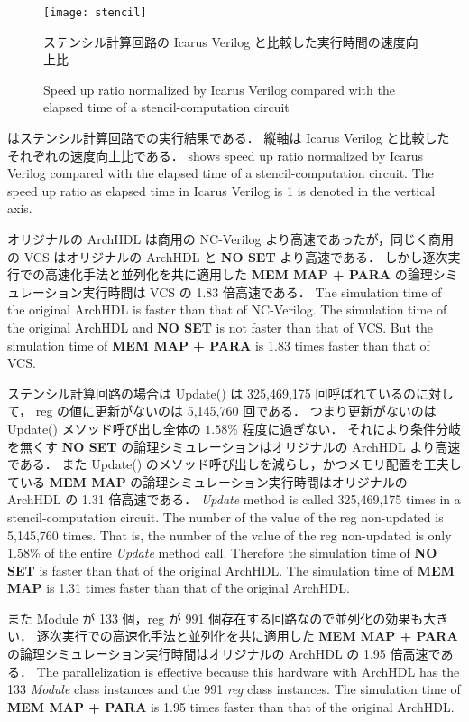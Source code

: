 \fi

\begin{figure}[tb]
 \centering
 \texttt{[image: stencil]}
 \caption{ステンシル計算回路の Icarus Verilog と比較した実行時間の速度向上比}
\fi
 \caption{Speed up ratio normalized by Icarus Verilog compared with the elapsed time of a stencil-computation circuit}
 \label{fig:stencil}
\end{figure}

 はステンシル計算回路での実行結果である．
縦軸は Icarus Verilog と比較したそれぞれの速度向上比である．
\fi
{} shows speed up ratio normalized by Icarus Verilog compared with the elapsed time of a stencil-computation circuit.
The speed up ratio as elapsed time in Icarus Verilog is 1 is denoted in the vertical axis.

オリジナルの ArchHDL は商用の NC-Verilog より高速であったが，同じく商用の VCS はオリジナルの ArchHDL と \textbf{NO SET} より高速である．
しかし逐次実行での高速化手法と並列化を共に適用した \textbf{MEM MAP + PARA} の論理シミュレーション実行時間は VCS の 1.83 倍高速である．
\fi
The simulation time of the original ArchHDL is faster than that of NC-Verilog.
The simulation time of the original ArchHDL and \textbf{NO SET} is not faster than that of VCS.
But the simulation time of \textbf{MEM MAP + PARA} is 1.83 times faster than that of VCS.

ステンシル計算回路の場合は Update() は 325,469,175 回呼ばれているのに対して，
reg の値に更新がないのは 5,145,760 回である．
つまり更新がないのは Update() メソッド呼び出し全体の $1.58\%$ 程度に過ぎない．
それにより条件分岐を無くす \textbf{NO SET} の論理シミュレーションはオリジナルの ArchHDL より高速である．
また Update() のメソッド呼び出しを減らし，かつメモリ配置を工夫している \textbf{MEM MAP} の論理シミュレーション実行時間はオリジナルの ArchHDL の 1.31 倍高速である．
\fi
\textit{Update} method is called 325,469,175 times in a stencil-computation circuit.
The number of the value of the reg non-updated is 5,145,760 times.
That is, the number of the value of the reg non-updated is only $1.58\%$ of the entire \textit{Update} method call.
Therefore the simulation time of \textbf{NO SET} is faster than that of the original ArchHDL.
The simulation time of \textbf{MEM MAP} is 1.31 times faster than that of the original ArchHDL.

また Module が 133 個，reg が 991 個存在する回路なので並列化の効果も大きい．
逐次実行での高速化手法と並列化を共に適用した \textbf{MEM MAP + PARA} の論理シミュレーション実行時間はオリジナルの ArchHDL の 1.95 倍高速である．
\fi
The parallelization is effective because this hardware with ArchHDL has the 133 \textit{Module} class instances and the 991 \textit{reg} class instances.
The simulation time of \textbf{MEM MAP + PARA} is 1.95 times faster than that of the original ArchHDL.


